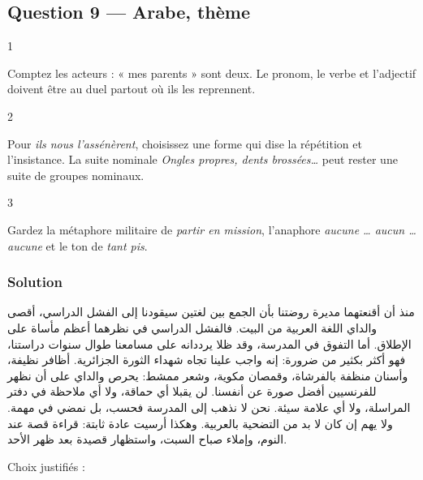 \documentclass[11pt,a4paper]{article}
\begin{document}
\hypertarget{question-9-arabe-thuxe8me}{%
\subsection{Question 9 --- Arabe, thème}\label{question-9-arabe-thuxe8me}}

\begin{indication}{1}

Comptez les acteurs : « mes parents » sont deux. Le pronom, le verbe et l'adjectif doivent être au duel partout où ils les reprennent.

\end{indication}

\begin{indication}{2}

Pour \emph{ils nous l'assénèrent}, choisissez une forme qui dise la répétition et l'insistance. La suite nominale \emph{Ongles propres, dents brossées\ldots{}} peut rester une suite de groupes nominaux.

\end{indication}

\begin{indication}{3}

Gardez la métaphore militaire de \emph{partir en mission}, l'anaphore \emph{aucune \ldots{} aucun \ldots{} aucune} et le ton de \emph{tant pis}.

\end{indication}

\hypertarget{solution-8}{%
\subsubsection{Solution}\label{solution-8}}

منذ أن أقنعتهما مديرة روضتنا بأن الجمع بين لغتين سيقودنا إلى الفشل الدراسي، أقصى والداي اللغة العربية من البيت. فالفشل الدراسي في نظرهما أعظم مأساة على الإطلاق. أما التفوق في المدرسة، وقد ظلا يرددانه على مسامعنا طوال سنوات دراستنا، فهو أكثر بكثير من ضرورة: إنه واجب علينا تجاه شهداء الثورة الجزائرية. أظافر نظيفة، وأسنان منظفة بالفرشاة، وقمصان مكوية، وشعر ممشط: يحرص والداي على أن نظهر للفرنسيين أفضل صورة عن أنفسنا. لن يقبلا أي حماقة، ولا أي ملاحظة في دفتر المراسلة، ولا أي علامة سيئة. نحن لا نذهب إلى المدرسة فحسب، بل نمضي في مهمة. ولا يهم إن كان لا بد من التضحية بالعربية. وهكذا أرسيت عادة ثابتة: قراءة قصة عند النوم، وإملاء صباح السبت، واستظهار قصيدة بعد ظهر الأحد.

Choix justifiés :
\end{document}
